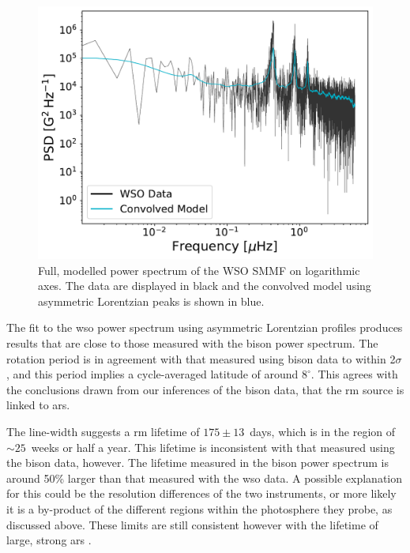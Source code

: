 \begin{figure}[ht!]
	\centering
	\includegraphics[width=\columnwidth]{WSO_PSD_model.pdf}
	\caption{Full, modelled power spectrum of the WSO SMMF on logarithmic axes. The data are displayed in black and the convolved model using asymmetric Lorentzian peaks is shown in blue.}
	\label{fig:WSO_PSD_fit}
\end{figure}



The fit to the \gls{wso} power spectrum using asymmetric Lorentzian profiles produces results that are close to those measured with the \gls{bison} power spectrum. The rotation period is in agreement with that measured using \gls{bison} data to within 2$\sigma$, and this period implies a cycle-averaged latitude of around $8^{\circ}$. This agrees with the conclusions drawn from our inferences of the \gls{bison} data, that the \gls{rm} source is linked to \glspl{ar}.

The line-width suggests a \gls{rm} lifetime of $175 \pm 13$~days, which is in the region of $\sim 25$~weeks or half a year. This lifetime is inconsistent with that measured using the \gls{bison} data, however. The lifetime measured in the \gls{bison} power spectrum is around 50\% larger than that measured with the \gls{wso} data. A possible explanation for this could be the resolution differences of the two instruments, or more likely it is a by-product of the different regions within the photosphere they probe, as discussed above. These limits are still consistent however with the lifetime of large, strong \glspl{ar} \citep{schrijver_photospheric_1994, van_driel-gesztelyi_evolution_2015}.

